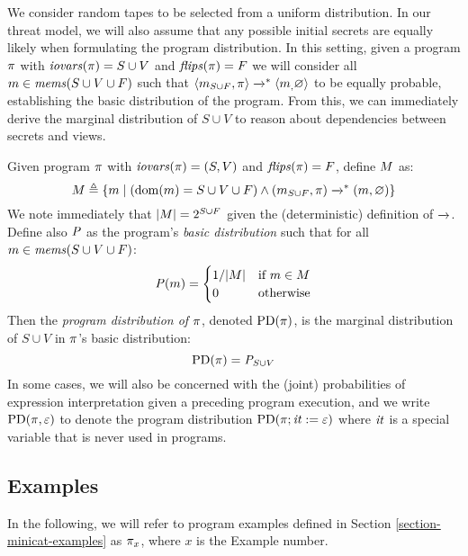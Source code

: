 We consider random tapes to be selected from a uniform distribution.
In our threat model, we will also assume that any possible initial
secrets are equally likely when formulating the program distribution.
In this setting, given a program $\pi$ with $\mathit{iovars}(\pi) = S \cup
V$ and $\mathit{flips}(\pi) = F$ we will consider all $m
\in \mathit{mems}(S \cup V \cup F)$ such that
$
\langle m_{S \cup F},\pi \rangle \xrightarrow{}^{*} \langle m_,\varnothing \rangle
$
to be equally probable, establishing the basic distribution of the
program. From this, we can immediately derive the marginal distribution
of $S \cup V$ to reason about dependencies between secrets and views. 
\begin{definition}
  \label{def-progd}
  \label{definition-progd}
  Given program $\pi$ with $\mathit{iovars}(\pi) = (S,V)$ and $\mathit{flips}(\pi) = F$, define $M$ as:
  $$
  M \triangleq \{ m \mid (\mathrm{dom}(m) = S \cup V \cup F) \wedge (m_{S \cup F},\pi) \xrightarrow{}^{*} (m,\varnothing) \}
  $$
  We note immediately that $|M| = 2^{S \cup F}$ given the (deterministic) definition of $\xrightarrow{}$. 
  Define also $\mathit{P}$ as the program's \emph{basic distribution} such that for all
  $m \in \mathit{mems}(S \cup V \cup F)$:
  $$
  \mathit{P}(m) =
  \begin{cases}
    1 / |M| & \text{if}\ m \in M\\
    0 & \text{otherwise}
  \end{cases}
  $$
  Then the \emph{program distribution of $\pi$}, denoted $\mathrm{PD}(\pi)$, is the
  marginal distribution of $S \cup V$ in $\pi$'s basic distribution:
  $$
  \mathrm{PD}(\pi) =  {\mathit{P}}_{S\cup V}
  $$
  In some cases, we will also be concerned with the (joint)
  probabilities of expression interpretation given a preceding program
  execution, and we write $\mathrm{PD}(\pi, \varepsilon)$ to denote the program
  distribution $\mathrm{PD}(\pi;\mathit{it} := \varepsilon)$ where $\mathit{it}$ is a
  special variable that is never used in programs.
\end{definition}


\subsection{Examples}
\label{section-pmf-examples}

In the following, we will refer to program examples defined in
Section \ref{section-minicat-examples} as $\pi_x$, where $x$
is the Example number. 

